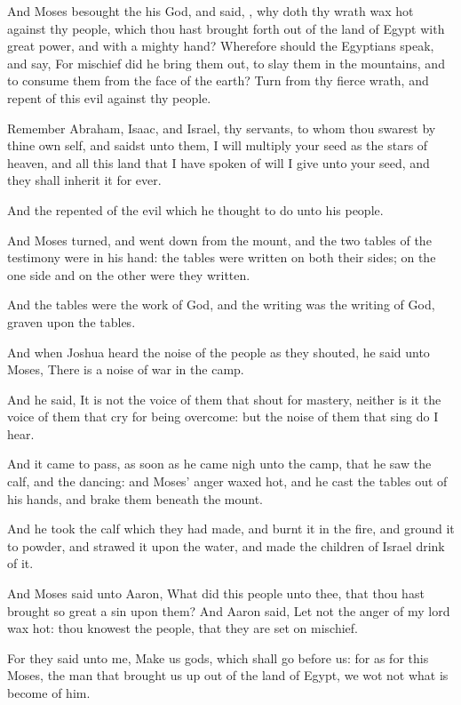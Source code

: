 \verse And Moses besought the \LORD his God, and said, \LORD, why doth thy wrath wax hot against thy people, which thou hast brought forth out of the land of Egypt with great power, and with a mighty hand?  \verse Wherefore should the Egyptians speak, and say, For mischief did he bring them out, to slay them in the mountains, and to consume them from the face of the earth? Turn from thy fierce wrath, and repent of this evil against thy people.

\verse Remember Abraham, Isaac, and Israel, thy servants, to whom thou swarest by thine own self, and saidst unto them, I will multiply your seed as the stars of heaven, and all this land that I have spoken of will I give unto your seed, and they shall inherit it for ever.

\verse And the \LORD repented of the evil which he thought to do unto his people.

\verse And Moses turned, and went down from the mount, and the two tables of the testimony were in his hand: the tables were written on both their sides; on the one side and on the other were they written.

\verse And the tables were the work of God, and the writing was the writing of God, graven upon the tables.

\verse And when Joshua heard the noise of the people as they shouted, he said unto Moses, There is a noise of war in the camp.

\verse And he said, It is not the voice of them that shout for mastery, neither is it the voice of them that cry for being overcome: but the noise of them that sing do I hear.

\verse And it came to pass, as soon as he came nigh unto the camp, that he saw the calf, and the dancing: and Moses' anger waxed hot, and he cast the tables out of his hands, and brake them beneath the mount.

\verse And he took the calf which they had made, and burnt it in the fire, and ground it to powder, and strawed it upon the water, and made the children of Israel drink of it.

\verse And Moses said unto Aaron, What did this people unto thee, that thou hast brought so great a sin upon them?  \verse And Aaron said, Let not the anger of my lord wax hot: thou knowest the people, that they are set on mischief.

\verse For they said unto me, Make us gods, which shall go before us: for as for this Moses, the man that brought us up out of the land of Egypt, we wot not what is become of him.

